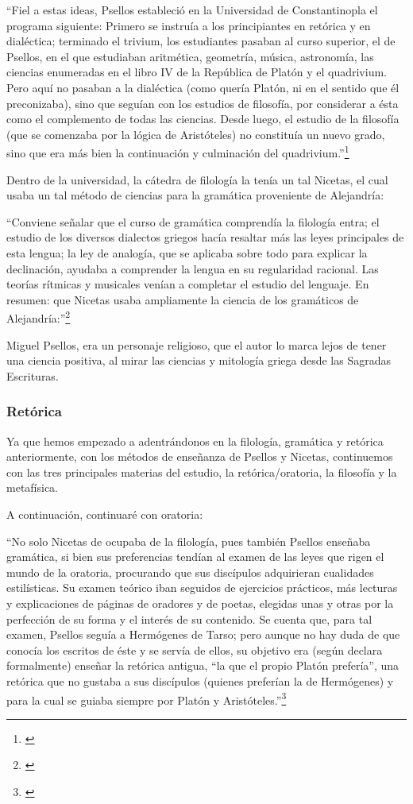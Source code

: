 	“Fiel a estas ideas, Psellos estableció en la Universidad de Constantinopla el programa siguiente: Primero se instruía a los principiantes en retórica y en dialéctica; terminado el trivium, los estudiantes pasaban al curso superior, el de Psellos, en el que estudiaban aritmética, geometría, música, astronomía, las ciencias enumeradas en el libro IV de la República de Platón y el quadrivium. Pero aquí no pasaban a la dialéctica (como quería Platón, ni en el sentido que él preconizaba), sino que seguían con los estudios de filosofía, por considerar a ésta como el complemento de todas las ciencias. Desde luego, el estudio de la filosofía (que se comenzaba por la lógica de Aristóteles) no constituía un nuevo grado, sino que era más bien la continuación y culminación del quadrivium.”\footnote{\cite[pp.~161--162]{filosofia}}

	Dentro de la universidad, la cátedra de filología la tenía un tal Nicetas, el cual usaba un tal método de ciencias para la gramática proveniente de Alejandría:

	“Conviene señalar que el curso de gramática comprendía la filología entra; el estudio de los diversos dialectos griegos hacía resaltar más las leyes principales de esta lengua; la ley de analogía, que se aplicaba sobre todo para explicar la declinación, ayudaba a comprender la lengua en su regularidad racional. Las teorías rítmicas y musicales venían a completar el estudio del lenguaje. En resumen: que Nicetas usaba ampliamente la ciencia de los gramáticos de Alejandría:”\footnote{\cite[p.~162]{filosofia}}

	Miguel Psellos, era un personaje religioso, que el autor lo marca lejos de tener una ciencia positiva, al mirar las ciencias y mitología griega desde las Sagradas Escrituras.


\subsubsection{Retórica}
	Ya que hemos empezado a adentrándonos en la filología, gramática y retórica anteriormente, con los métodos de enseñanza de Psellos y Nicetas, continuemos con las tres principales materias del estudio, la retórica/oratoria, la filosofía y la metafísica.

	A continuación, continuaré con oratoria:

	“No solo Nicetas de ocupaba de la filología, pues también Psellos enseñaba gramática, si bien sus preferencias tendían al examen de las leyes que rigen el mundo de la oratoria, procurando que sus discípulos adquirieran cualidades estilísticas. Su examen teórico iban seguidos de ejercicios prácticos, más lecturas y explicaciones de páginas de oradores y de poetas, elegidas unas y otras por la perfección de su forma y el interés de su contenido. Se cuenta que, para tal examen, Psellos seguía a Hermógenes de Tarso; pero aunque no hay duda de que conocía los escritos de éste y se servía de ellos, su objetivo era (según declara formalmente) enseñar la retórica antigua, “la que el propio Platón prefería”, una retórica que no gustaba a sus discípulos (quienes preferían la de Hermógenes) y para la cual se guiaba siempre por Platón y Aristóteles.”\footnote{\cite[p.~163]{filosofia}}

